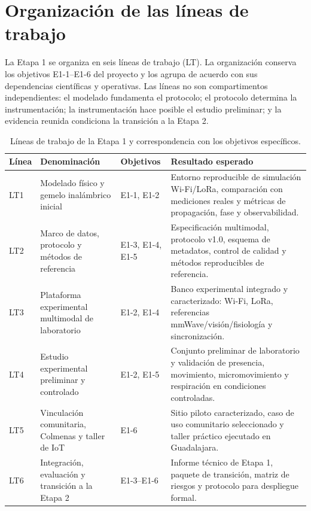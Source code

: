 \section{Organización de las líneas de trabajo}

La Etapa 1 se organiza en seis líneas de trabajo (LT). La organización conserva los
objetivos E1-1--E1-6 del proyecto y los agrupa de acuerdo con sus dependencias científicas
y operativas. Las líneas no son compartimentos independientes: el modelado fundamenta
el protocolo; el protocolo determina la instrumentación; la instrumentación hace posible
el estudio preliminar; y la evidencia reunida condiciona la transición a la Etapa 2.

\begin{table}[H]
\centering
\caption{Líneas de trabajo de la Etapa 1 y correspondencia con los objetivos específicos.}
\label{tab:wbs_stage1_summary}
\small
\begin{tabularx}{\textwidth}{P{1.15cm}P{3.25cm}P{1.9cm}L}
\toprule
\textbf{Línea} & \textbf{Denominación} & \textbf{Objetivos} & \textbf{Resultado esperado}\\
\midrule
LT1 & Modelado físico y gemelo inalámbrico inicial
& E1-1, E1-2
& Entorno reproducible de simulación Wi-Fi/LoRa, comparación con mediciones reales y métricas de propagación, fase y observabilidad.\\

LT2 & Marco de datos, protocolo y métodos de referencia
& E1-3, E1-4, E1-5
& Especificación multimodal, protocolo v1.0, esquema de metadatos, control de calidad y métodos reproducibles de referencia.\\

LT3 & Plataforma experimental multimodal de laboratorio
& E1-2, E1-4
& Banco experimental integrado y caracterizado: Wi-Fi, LoRa, referencias mmWave/visión/fisiología y sincronización.\\

LT4 & Estudio experimental preliminar y controlado
& E1-2, E1-5
& Conjunto preliminar de laboratorio y validación de presencia, movimiento, micromovimiento y respiración en condiciones controladas.\\

LT5 & Vinculación comunitaria, Colmenas y taller de IoT
& E1-6
& Sitio piloto caracterizado, caso de uso comunitario seleccionado y taller práctico ejecutado en Guadalajara.\\

LT6 & Integración, evaluación y transición a la Etapa 2
& E1-3--E1-6
& Informe técnico de Etapa 1, paquete de transición, matriz de riesgos y protocolo para despliegue formal.\\
\bottomrule
\end{tabularx}
\end{table}

